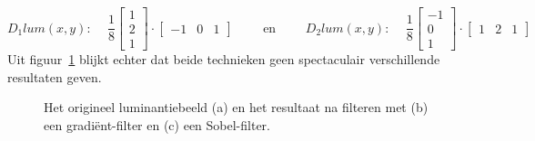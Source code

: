 \begin{displaymath}
D_1 lum(x,y)\textrm{: }\quad \frac{1}{8} \left[ \begin{array}{c} 1 \\ 2 \\ 1 \end{array} \right] \cdot \left[ \begin{array}{ccc} -1 & 0 & 1 \end{array} \right] \qquad \textrm{ en } 
\qquad D_2 lum(x,y)\textrm{: }\quad \frac{1}{8} \left[ \begin{array}{c} -1 \\ 0 \\ 1 \end{array} \right] \cdot \left[ \begin{array}{ccc} 1 & 2 & 1 \end{array} \right]
\end{displaymath}
Uit figuur~\ref{fig:randdetectie} blijkt echter dat beide technieken geen spectaculair verschillende 
resultaten geven.

\begin{figure}[!bp]
\vspace{10pt}
\centering
{}
\caption{\label{fig:randdetectie}Het origineel luminantiebeeld (a) en het resultaat na 
filteren met (b) een gradi\"ent-filter en (c) een Sobel-filter.}
\end{figure}


